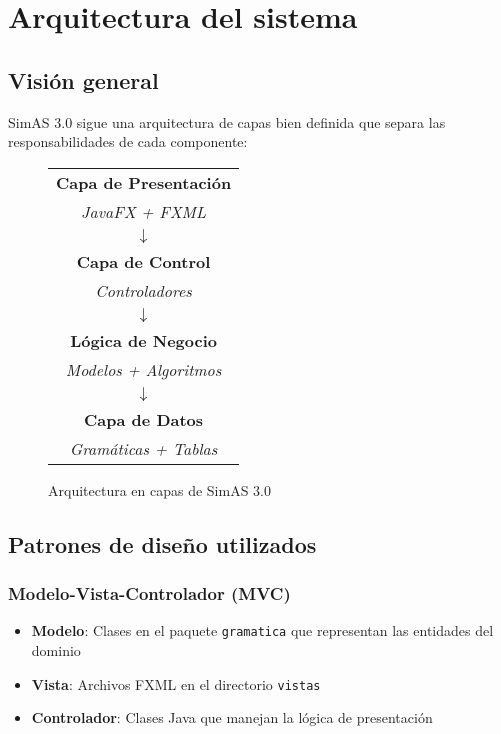 \section{Arquitectura del sistema}

\subsection{Visión general}

SimAS 3.0 sigue una arquitectura de capas bien definida que separa las responsabilidades de cada componente:

\begin{figure}[H]
\centering
\begin{tabular}{|c|}
\hline
\textbf{Capa de Presentación} \\
\textit{JavaFX + FXML} \\
\hline
$\downarrow$ \\
\hline
\textbf{Capa de Control} \\
\textit{Controladores} \\
\hline
$\downarrow$ \\
\hline
\textbf{Lógica de Negocio} \\
\textit{Modelos + Algoritmos} \\
\hline
$\downarrow$ \\
\hline
\textbf{Capa de Datos} \\
\textit{Gramáticas + Tablas} \\
\hline
\end{tabular}
\caption{Arquitectura en capas de SimAS 3.0}
\label{fig:arquitectura-capas}
\end{figure}

\subsection{Patrones de diseño utilizados}

\subsubsection{Modelo-Vista-Controlador (MVC)}
\begin{itemize}
    \item \textbf{Modelo}: Clases en el paquete \texttt{gramatica} que representan las entidades del dominio
    \item \textbf{Vista}: Archivos FXML en el directorio \texttt{vistas}
    \item \textbf{Controlador}: Clases Java que manejan la lógica de presentación
\end{itemize}

